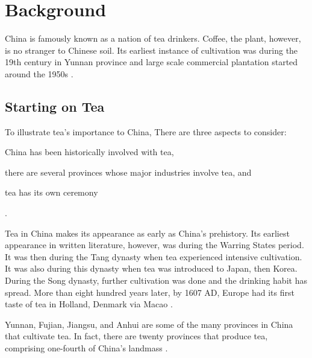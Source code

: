 \section{Background}\label{sec:background}

China is famously known as a nation of tea drinkers. Coffee, the plant, however,
is no stranger to Chinese soil. Its earliest instance of cultivation was during
the 19th century in Yunnan province and large scale commercial plantation started
around the 1950s \autocite{zhang_coffee_2014}.

\subsection{Starting on Tea}


To illustrate tea's importance to China, There are three aspects to consider:
\begin{enumerate*}
	\item China has been historically involved with tea,
	\item there are several provinces whose major industries involve tea, and
	\item tea has its own ceremony
\end{enumerate*}.

Tea in China makes its appearance as early as China's prehistory. Its earliest
appearance in written literature, however, was during the Warring States period.
It was then during the Tang dynasty when tea experienced intensive cultivation.
It was also during this dynasty when tea was introduced to Japan, then Korea.
During the Song dynasty, further cultivation was done and the drinking habit has
spread. More than eight hundred years later, by 1607 AD, Europe had its first
taste of tea in Holland, Denmark via Macao \autocite{chen_tea_2012}.

Yunnan, Fujian, Jiangsu, and Anhui are some of the many provinces in China that
cultivate tea. In fact, there are twenty provinces that produce tea, comprising
one-fourth of China's landmass \autocite{chen_tea_2012}. %


